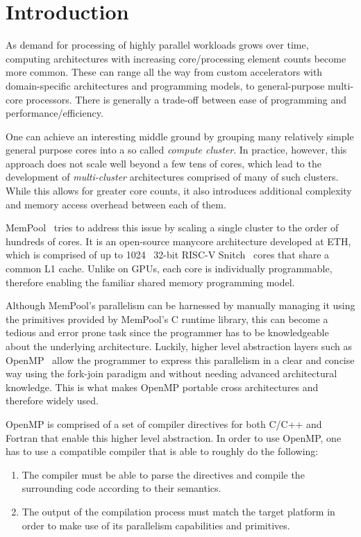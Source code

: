 \chapter{Introduction} \label{ch:introduction}

As demand for processing of highly parallel workloads grows over time, computing architectures with
increasing core/processing element counts become more common. These can range all the way from
custom accelerators with domain-specific architectures and programming models, to general-purpose
multi-core processors. There is generally a trade-off between ease of programming and
performance/efficiency.

One can achieve an interesting middle ground by grouping many relatively simple general purpose
cores into a so called \emph{compute cluster}. In practice, however, this approach does not scale
well beyond a few tens of cores, which lead to the development of \emph{multi-cluster} architectures
comprised of many of such clusters. While this allows for greater core counts, it also introduces
additional complexity and memory access overhead between each of them.

MemPool~\cite{mempool} tries to address this issue by scaling a single cluster to the order of
hundreds of cores. It is an open-source manycore architecture developed at ETH, which is comprised
of up to 1024~\cite{terapool} 32-bit RISC-V Snitch~\cite{snitch} cores that share a common L1 cache.
Unlike on GPUs, each core is individually programmable, therefore enabling the familiar shared
memory programming model.

Although MemPool's parallelism can be harnessed by manually managing it using the primitives
provided by MemPool's C runtime library, this can become a tedious and error prone task since the
programmer has to be knowledgeable about the underlying architecture. Luckily, higher level
abstraction layers such as OpenMP~\cite{openmp} allow the programmer to express this parallelism in
a clear and concise way using the fork-join paradigm and without needing advanced architectural
knowledge. This is what makes OpenMP portable cross architectures and therefore widely used.

OpenMP is comprised of a set of compiler directives for both C/C++ and Fortran that enable this
higher level abstraction. In order to use OpenMP, one has to use a compatible compiler that is able
to roughly do the following:

\begin{enumerate}
	\item The compiler must be able to parse the directives and compile the surrounding code
	      according to their semantics.
	\item The output of the compilation process must match the target platform in order to make use
	      of its parallelism capabilities and primitives.
\end{enumerate}

